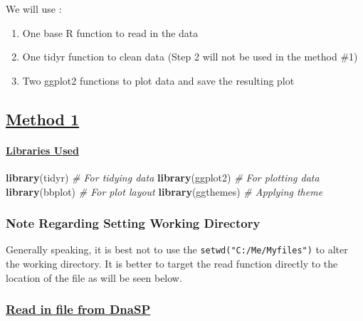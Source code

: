 \documentclass[]{article}
\newenvironment{Shaded}{\begin{snugshade}}{\end{snugshade}}
\newcommand{\KeywordTok}[1]{\textcolor[rgb]{0.13,0.29,0.53}{\textbf{#1}}}
\newcommand{\CommentTok}[1]{\textcolor[rgb]{0.56,0.35,0.01}{\textit{#1}}}
\newcommand{\NormalTok}[1]{#1}
\providecommand{\tightlist}{%
  \setlength{\itemsep}{0pt}\setlength{\parskip}{0pt}}
\let\oldparagraph\paragraph
\renewcommand{\paragraph}[1]{\oldparagraph{#1}\mbox{}}
\begin{document}
We will use :

\begin{enumerate}
\def\labelenumi{\arabic{enumi}.}
\tightlist
\item
  One base R function to read in the data
\item
  One tidyr function to clean data (Step 2 will not be used in the
  method \#1)
\item
  Two ggplot2 functions to plot data and save the resulting plot
\end{enumerate}

\subsection{\texorpdfstring{\href{sheading-2}{Method
1}}{Method 1}}\label{method-1}

\paragraph{\texorpdfstring{\href{sheading-2}{Libraries
Used}}{Libraries Used}}\label{libraries-used}

\begin{Shaded}
\begin{Highlighting}[]
\KeywordTok{library}\NormalTok{(tidyr)   }\CommentTok{# For tidying data}
\KeywordTok{library}\NormalTok{(ggplot2) }\CommentTok{# For plotting data}
\KeywordTok{library}\NormalTok{(bbplot) }\CommentTok{# For plot layout }
\KeywordTok{library}\NormalTok{(ggthemes) }\CommentTok{# Applying theme }
\end{Highlighting}
\end{Shaded}

\subsubsection{Note Regarding Setting Working
Directory}\label{note-regarding-setting-working-directory}

Generally speaking, it is best not to use the
\texttt{setwd("C:/Me/Myfiles")} to alter the working directory. It is
better to target the read function directly to the location of the file
as will be seen below.

\subsubsection{\texorpdfstring{\href{sheading-2}{Read in file from
DnaSP}}{Read in file from DnaSP}}\label{read-in-file-from-dnasp}
\end{document}
